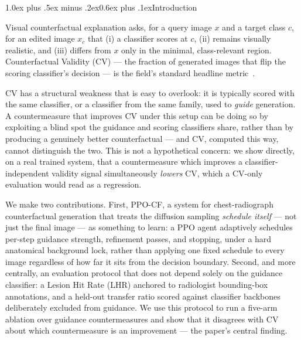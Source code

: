 \documentclass[10pt,twocolumn]{article}
\makeatletter
\renewcommand\section{\@startsection{section}{1}{\z@}%
  {1.0ex plus .5ex minus .2ex}{0.6ex plus .1ex}{\normalfont\large\bfseries}}
\newcommand{\method}{\textsc{PPO-CF}}
\makeatother
\begin{document}
\section{Introduction}

Visual counterfactual explanation asks, for a query image $x$ and a
target class $c$, for an edited image $x_c$ that (i) a classifier scores
at $c$, (ii) remains visually realistic, and (iii) differs from $x$ only
in the minimal, class-relevant region. Counterfactual Validity (CV) — the
fraction of generated images that flip the scoring classifier's decision
— is the field's standard headline metric~\cite{singla2022}.

CV has a structural weakness that is easy to overlook: it is typically
scored with the same classifier, or a classifier from the same family,
used to \emph{guide} generation. A countermeasure that improves CV under
this setup can be doing so by exploiting a blind spot the guidance and
scoring classifiers share, rather than by producing a genuinely better
counterfactual — and CV, computed this way, cannot distinguish the two.
This is not a hypothetical concern: we show directly, on a real trained
system, that a countermeasure which improves a classifier-independent
validity signal simultaneously \emph{lowers} CV, which a CV-only
evaluation would read as a regression.

We make two contributions. First, \method{}, a system for chest-radiograph
counterfactual generation that treats the diffusion sampling
\emph{schedule itself} — not just the final image — as something to learn:
a PPO agent adaptively schedules per-step guidance strength, refinement
passes, and stopping, under a hard anatomical background lock, rather
than applying one fixed schedule to every image regardless of how far it
sits from the decision boundary. Second, and more centrally, an
evaluation protocol that does not depend solely on the guidance
classifier: a Lesion Hit Rate (LHR) anchored to radiologist bounding-box
annotations, and a held-out transfer ratio scored against classifier
backbones deliberately excluded from guidance. We use this protocol to
run a five-arm ablation over guidance countermeasures and show that it
disagrees with CV about which countermeasure is an improvement — the
paper's central finding.
\end{document}
